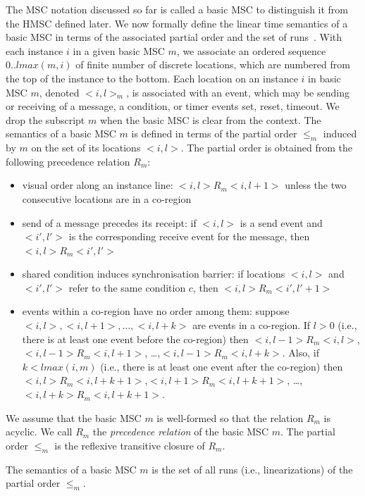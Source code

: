 \documentclass{entcs}
\begin{document}
The MSC notation discussed so far is called a basic MSC 
to distinguish it from the HMSC defined later. 
We now formally define the linear time semantics 
of a basic MSC in terms of the associated partial 
order and the set of runs~\cite{Alur96,DammHarel99,BVP02}. With 
each instance $i$ in a given basic MSC $m$, we 
associate an ordered sequence $0 .. lmax(m,i)$ 
of finite number of discrete locations, which 
are numbered from the top of the instance to 
the bottom. Each location on an instance $i$ in 
basic MSC $m$, denoted $<i,l>_m$, is associated 
with an event, which may be sending or receiving 
of a message, a condition, or timer events set, 
reset, timeout. We drop the subscript $m$ when 
the basic MSC is clear from the context. The 
semantics of a basic MSC $m$ is defined in terms 
of the partial order $\leq_m$ induced by $m$ on 
the set of its locations $<i,l>$. The partial 
order is obtained from the following precedence 
relation $R_m$:
\begin{itemize}
\item visual order along an instance line: 
$<i,l> R_m <i,l+1>$ unless the two consecutive 
locations are in a co-region
\item send of a message precedes its receipt: 
if $<i,l>$ is a send event and $<i',l'>$ is the 
corresponding receive event for the message, 
then $<i,l> R_m <i',l'>$
\item shared condition induces synchronisation 
barrier: if locations $<i,l>$ and $<i',l'>$ 
refer to the same condition $c$, then 
$<i,l> R_m <i',l'+1>$
\item events within a co-region have no order 
among them: suppose $<i,l>,<i,l+1>,\ldots,<i,l+k>$ 
are events in a co-region. If $l > 0$ (i.e., 
there is at least one event before the co-region) 
then $<i,l-1> R_m <i,l>$, $<i,l-1> R_m <i,l+1>$,
\ldots,$<i,l-1> R_m <i,l+k>$. Also, if $k < lmax(i,m)$ 
(i.e., there is at least one event after the co-region) 
then $<i,l> R_m <i,l+k+1>$,$<i,l+1> R_m <i,l+k+1>$,
\ldots,$<i,l+k> R_m <i,l+k+1>$.
\end{itemize}

We assume that the basic MSC $m$ is well-formed 
so that the relation $R_m$ is acyclic. We call 
$R_m$ the {\em precedence relation} of the basic 
MSC $m$. The partial order $\leq_m$ is the 
reflexive transitive closure of $R_m$.

\begin{definition}
\label{bmscsem}
The semantics of a basic MSC $m$ is the set of all 
runs (i.e., linearizations) of the partial order 
$\leq_m$.
\end{definition}
\end{document}
